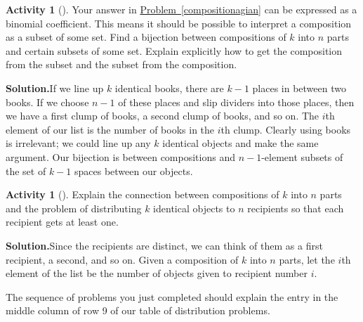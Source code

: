 \documentclass[10pt,]{book}
\theoremstyle{plain}
\theoremstyle{definition}
\newtheorem{activity}[project]{Activity}
\numberwithin{equation}{chapter}
\begin{document}
\begin{activity}[]\label{activity-29}
Your answer in \hyperref[compositionagian]{Problem~\ref{compositionagian}} can be expressed as a binomial coefficient. This means it should be possible to interpret a composition as a subset of some set. Find a bijection between compositions of \(k\) into \(n\) parts and certain subsets of some set. Explain explicitly how to get the composition from the subset and the subset from the composition.%
\par\medskip\noindent%
\textbf{Solution.}\quad If we line up \(k\) identical books, there are \(k-1\) places in between two books. If we choose \(n-1\) of these places and slip dividers into those places, then we have a first clump of books, a second clump of books, and so on. The \(i\)th element of our list is the number of books in the \(i\)th clump. Clearly using books is irrelevant; we could line up any \(k\) identical objects and make the same argument. Our bijection is between compositions and \(n-1\)-element subsets of the set of \(k-1\) spaces between our objects.%
\end{activity}
\begin{activity}[]\label{activity-30}
Explain the connection between compositions of \(k\) into \(n\) parts and the problem of distributing \(k\) identical objects to \(n\) recipients so that each recipient gets at least one.%
\par\medskip\noindent%
\textbf{Solution.}\quad Since the recipients are distinct, we can think of them as a first recipient, a second, and so on. Given a composition of \(k\) into \(n\) parts, let the \(i\)th element of the list be the number of objects given to recipient number \(i\).%
\end{activity}
The sequence of problems you just completed should explain the entry in the middle column of row 9 of our table of distribution problems.%
\typeout{************************************************}
\typeout{************************************************}
\end{document}
